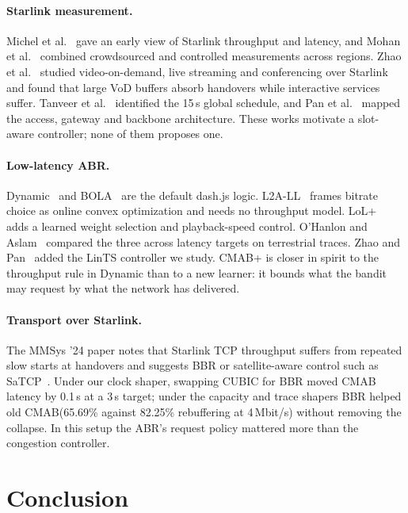 \documentclass[sigconf]{acmart}
\newcommand{\cmabp}{CMAB+\xspace}
\newcommand{\oldcmab}{old CMAB\xspace}
\begin{document}
\paragraph{Starlink measurement.} Michel et al.~\cite{michel2022firstlook} gave an early view of Starlink throughput and latency, and Mohan et al.~\cite{mohan2024multifaceted} combined crowdsourced and controlled measurements across regions. Zhao et al.~\cite{zhao2023reality} studied video-on-demand, live streaming and conferencing over Starlink and found that large VoD buffers absorb handovers while interactive services suffer. Tanveer et al.~\cite{tanveer2023constellations} identified the 15\,s global schedule, and Pan et al.~\cite{pan2023measuring} mapped the access, gateway and backbone architecture. These works motivate a slot-aware controller; none of them proposes one.

\paragraph{Low-latency ABR.} Dynamic~\cite{spiteri2019dynamic} and BOLA~\cite{spiteri2020bola} are the default dash.js logic. L2A-LL~\cite{karagkioules2020l2a} frames bitrate choice as online convex optimization and needs no throughput model. LoL+~\cite{bentaleb2022lolp} adds a learned weight selection and playback-speed control. O'Hanlon and Aslam~\cite{ohanlon2023latency} compared the three across latency targets on terrestrial traces. Zhao and Pan~\cite{zhao2024mmsys} added the LinTS controller we study. \cmabp is closer in spirit to the throughput rule in Dynamic than to a new learner: it bounds what the bandit may request by what the network has delivered.

\paragraph{Transport over Starlink.} The MMSys '24 paper notes that Starlink TCP throughput suffers from repeated slow starts at handovers and suggests BBR or satellite-aware control such as SaTCP~\cite{cao2023satcp}. Under our clock shaper, swapping CUBIC for BBR moved CMAB latency by 0.1\,s at a 3\,s target; under the capacity and trace shapers BBR helped \oldcmab (65.69\% against 82.25\% rebuffering at 4\,Mbit/s) without removing the collapse. In this setup the ABR's request policy mattered more than the congestion controller.

\section{Conclusion}
\end{document}
